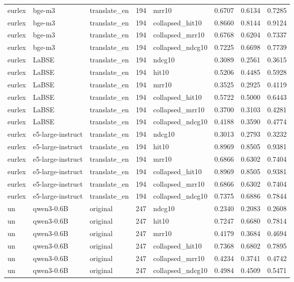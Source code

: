 \begin{tabular}{lllrlrrr}
eurlex & bge-m3 & translate\_en & 194 & mrr10 & 0.6707 & 0.6134 & 0.7285 \\
eurlex & bge-m3 & translate\_en & 194 & collapsed\_hit10 & 0.8660 & 0.8144 & 0.9124 \\
eurlex & bge-m3 & translate\_en & 194 & collapsed\_mrr10 & 0.6768 & 0.6204 & 0.7337 \\
eurlex & bge-m3 & translate\_en & 194 & collapsed\_ndcg10 & 0.7225 & 0.6698 & 0.7739 \\
eurlex & LaBSE & translate\_en & 194 & ndcg10 & 0.3089 & 0.2561 & 0.3615 \\
eurlex & LaBSE & translate\_en & 194 & hit10 & 0.5206 & 0.4485 & 0.5928 \\
eurlex & LaBSE & translate\_en & 194 & mrr10 & 0.3525 & 0.2925 & 0.4119 \\
eurlex & LaBSE & translate\_en & 194 & collapsed\_hit10 & 0.5722 & 0.5000 & 0.6443 \\
eurlex & LaBSE & translate\_en & 194 & collapsed\_mrr10 & 0.3700 & 0.3103 & 0.4281 \\
eurlex & LaBSE & translate\_en & 194 & collapsed\_ndcg10 & 0.4188 & 0.3590 & 0.4774 \\
eurlex & e5-large-instruct & translate\_en & 194 & ndcg10 & 0.3013 & 0.2793 & 0.3232 \\
eurlex & e5-large-instruct & translate\_en & 194 & hit10 & 0.8969 & 0.8505 & 0.9381 \\
eurlex & e5-large-instruct & translate\_en & 194 & mrr10 & 0.6866 & 0.6302 & 0.7404 \\
eurlex & e5-large-instruct & translate\_en & 194 & collapsed\_hit10 & 0.8969 & 0.8505 & 0.9381 \\
eurlex & e5-large-instruct & translate\_en & 194 & collapsed\_mrr10 & 0.6866 & 0.6302 & 0.7404 \\
eurlex & e5-large-instruct & translate\_en & 194 & collapsed\_ndcg10 & 0.7375 & 0.6886 & 0.7844 \\
un & qwen3-0.6B & original & 247 & ndcg10 & 0.2340 & 0.2083 & 0.2608 \\
un & qwen3-0.6B & original & 247 & hit10 & 0.7247 & 0.6680 & 0.7814 \\
un & qwen3-0.6B & original & 247 & mrr10 & 0.4179 & 0.3684 & 0.4694 \\
un & qwen3-0.6B & original & 247 & collapsed\_hit10 & 0.7368 & 0.6802 & 0.7895 \\
un & qwen3-0.6B & original & 247 & collapsed\_mrr10 & 0.4234 & 0.3741 & 0.4742 \\
un & qwen3-0.6B & original & 247 & collapsed\_ndcg10 & 0.4984 & 0.4509 & 0.5471 \\

\end{tabular}
